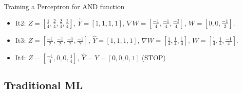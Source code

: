 \documentclass[xcolor=table]{beamer}
\begin{document}
\begin{frame}
\begin{exampleblock}{Training a Perceptron for AND function}
\begin{minipage}{0.79\textwidth}
\begin{itemize}
					\item It2: $ Z = [\frac{1}{4}, \frac{2}{4}, \frac{2}{4}, \frac{3}{4}] $, 
					$ \hat{Y} = [1, 1, 1, 1] $, 
					$ \nabla W = [\frac{-1}{4}, \frac{-1}{4}, \frac{-3}{4}] $,
					$ W = [0, 0, \frac{-1}{2}] $.
					
					\item It3: $ Z = [\frac{-1}{2}, \frac{-1}{2}, \frac{-1}{2}, \frac{-1}{2}] $, 
					$ \hat{Y} = [1, 1, 1, 1] $, 
					$ \nabla W = [\frac{1}{4}, \frac{1}{4}, \frac{1}{4}] $,
					$ W = [\frac{1}{4}, \frac{1}{4}, \frac{-1}{4}] $.
					
					\item It4: $ Z = [\frac{-1}{4}, 0, 0, \frac{1}{4}] $, 
					$ \hat{Y} = Y = [0, 0, 0, 1] $ (STOP)
				\end{itemize}
			\end{minipage}
		\end{exampleblock}
		
	\end{frame}
	
	\subsection{Traditional ML}
	
\end{document}
